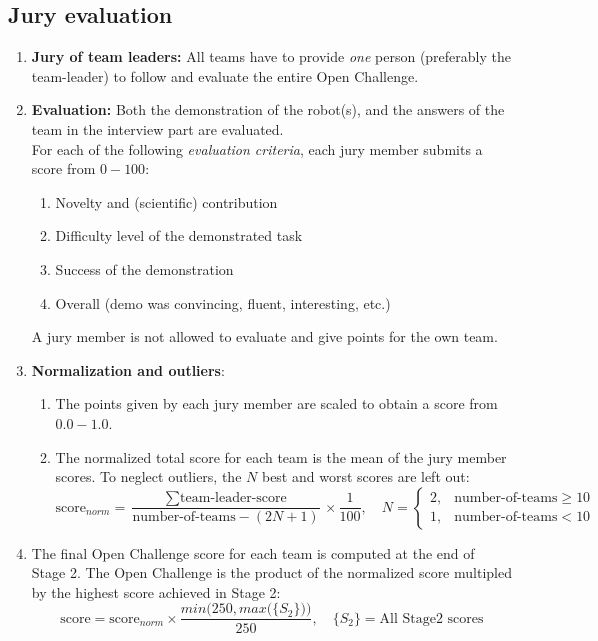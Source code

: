 \OpenDemonstrationChanges

\subsection{Jury evaluation}
\begin{enumerate}
	\item \textbf{Jury of team leaders:} All teams have to provide \emph{one} person
	(preferably the team-leader) to follow and evaluate the entire Open Challenge.
	\item \textbf{Evaluation:} Both the demonstration of the robot(s), and the answers of the team in the interview part are evaluated.\\
	For each of the following \emph{evaluation criteria}, each jury member submits a score from $0-100$:
	\begin{enumerate}
	\item Novelty and (scientific) contribution
	\item Difficulty level of the demonstrated task
	\item Success of the demonstration
	\item Overall (demo was convincing, fluent, interesting, etc.)
	\end{enumerate}
	A jury member is not allowed to evaluate and give points for the own team.
	\item \textbf{Normalization and outliers}:
	\begin{enumerate}
		\item The points given by each jury member are scaled to obtain a score from $0.0-1.0$.
		\item The normalized total score for each team is the mean of the jury member scores.
			To neglect outliers, the $N$ best and worst scores are left out:
			$$\mbox{score}_{norm} = \frac{\sum\mbox{team-leader-score}}{\mbox{number-of-teams} - (2N+1)}\times\frac{1}{100},
			\quad N=\begin{cases}2, & \mbox{number-of-teams} \ge 10\\1, & \mbox{number-of-teams} < 10 \end{cases}$$
		\end{enumerate}
		\item The final Open Challenge score for each team is computed at the end of Stage 2. The Open Challenge  is the product of the normalized score multipled by the highest score achieved in Stage 2:
		$$\mbox{score} = \mbox{score}_{norm} \times \frac{min\Big(250, max\big(\{S_2\}\big)\Big)}{250},
		\quad \{S_2\}=\mbox{All Stage2 scores}
		$$
\end{enumerate}

